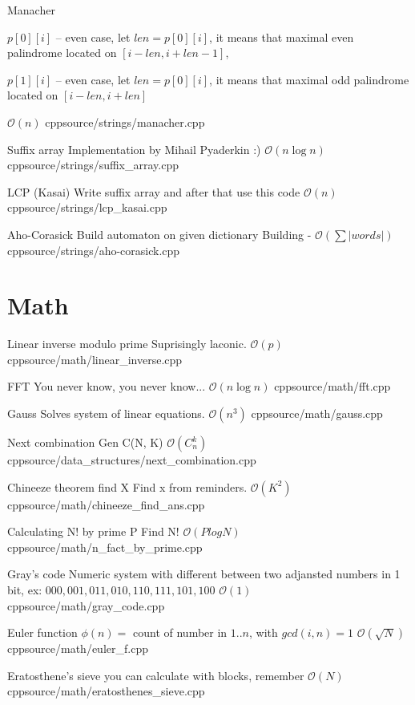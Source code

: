 \documentclass[landscape, 10pt, a4paper, oneside, twocolumn]{extarticle}
\begin{document}
\Algorithm
{Manacher}
{$p[0][i]$ – even case, let $len = p[0][i]$,
it means that maximal even palindrome located on $[i - len, i + len - 1]$,

$p[1][i]$ – even case, let $len = p[0][i]$,
it means that maximal odd palindrome located on $[i - len, i + len]$
}
{$\mathcal{O}(n)$}
{cpp}{source/strings/manacher.cpp}

\Algorithm
{Suffix array}
{Implementation by Mihail Pyaderkin :)}
{$\mathcal{O}(n \log n)$}
{cpp}{source/strings/suffix_array.cpp}

\Algorithm
{LCP (Kasai)}
{Write suffix array and after that use this code}
{$\mathcal{O}(n)$}
{cpp}{source/strings/lcp_kasai.cpp}

\Algorithm
{Aho-Corasick}
{Build automaton on given dictionary}
{Building - $\mathcal{O}(\sum|words|)$}
{cpp}{source/strings/aho-corasick.cpp}




\section{Math}

\Algorithm
{Linear inverse modulo prime}
{Suprisingly laconic.}
{$\mathcal{O}(p)$}
{cpp}{source/math/linear_inverse.cpp}

\Algorithm
{FFT}
{You never know, you never know...}
{$\mathcal{O}(n \log n)$}
{cpp}{source/math/fft.cpp}

\Algorithm
{Gauss}
{Solves system of linear equations.}
{$\mathcal{O}(n^{3})$}
{cpp}{source/math/gauss.cpp}

\Algorithm
{Next combination}
{Gen C(N, K)}
{$\mathcal{O}(C_{n}^{k})$}
{cpp}{source/data_structures/next_combination.cpp}

\Algorithm
{Chineeze theorem find X}
{Find x from reminders.}
{$\mathcal{O}(K^{2})$}
{cpp}{source/math/chineeze_find_ans.cpp}

\Algorithm
{Calculating N! by prime P}
{Find N!}
{$\mathcal{O}(P log N)$}
{cpp}{source/math/n_fact_by_prime.cpp}

\Algorithm
{Gray's code}
{Numeric system with different between two adjansted numbers in 1 bit, ex: $000, 001, 011, 010, 110, 111, 101, 100$}
{$\mathcal{O}(1)$}
{cpp}{source/math/gray_code.cpp}

\Algorithm
{Euler function}
{$\phi(n) = $ count of number in $1..n$, with $gcd(i, n) = 1$}
{$\mathcal{O}(\sqrt{N})$}
{cpp}{source/math/euler_f.cpp}

\Algorithm
{Eratosthene's sieve}
{you can calculate with blocks, remember}
{$\mathcal{O}(N)$}
{cpp}{source/math/eratosthenes_sieve.cpp}
\end{document}

